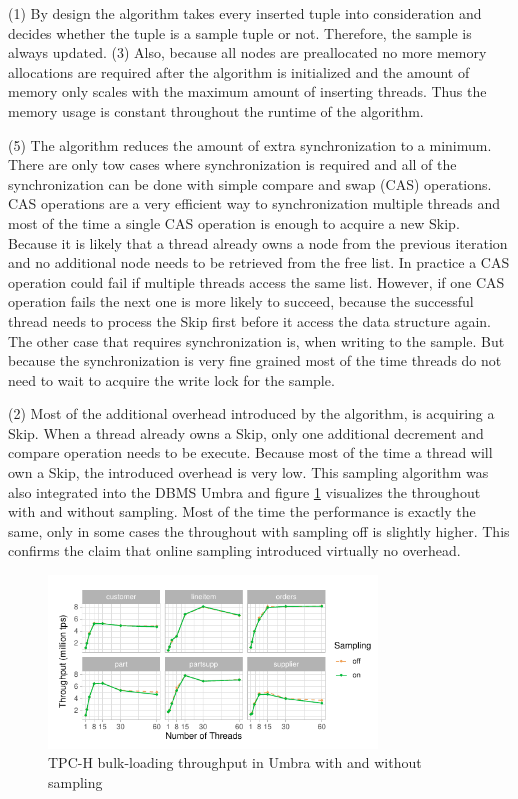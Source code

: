 \documentclass[sigconf,nonacm]{acmart}
\begin{document}
        (1) By design the algorithm takes every inserted tuple into consideration and decides whether the tuple is a sample tuple or not. Therefore, the sample is always updated. (3) Also, because all nodes are preallocated no more memory allocations are required after the algorithm is initialized and the amount of memory only scales with the maximum amount of inserting threads. Thus the memory usage is constant throughout the runtime of the algorithm. 

        (5) The algorithm reduces the amount of extra synchronization to a minimum. There are only tow cases where synchronization is required and all of the synchronization can be done with simple compare and swap (CAS) operations. CAS operations are a very efficient way to  synchronization multiple threads and most of the time a single CAS operation is enough to acquire a new Skip. Because it is likely that a thread already owns a node from the previous iteration and no additional node needs to be retrieved from the free list. In practice a CAS operation could fail if multiple threads access the same list. However, if one CAS operation fails the next one is more likely to succeed, because the successful thread needs to process the Skip first before it access the data structure again. The other case that requires synchronization is, when writing to the sample. But because the synchronization is very fine grained most of the time threads do not need to wait to acquire the write lock for the sample.

        (2) Most of the additional overhead introduced by the algorithm, is acquiring a Skip. When a thread already owns a Skip, only one additional decrement and compare operation needs to be execute. Because most of the time a thread will own a Skip, the introduced overhead is very low. This sampling algorithm was also integrated into the DBMS Umbra\cite{Umbra} and figure \ref{fig:performance} visualizes the throughout with and without sampling. Most of the time the performance is exactly the same, only in some cases the throughout with sampling off is slightly higher. This confirms the claim that online sampling introduced virtually no overhead.
        \begin{figure}[h]
            \includegraphics[height=4.6cm]{figure7.pdf}
            \caption{TPC-H bulk-loading throughput in Umbra\cite{Umbra} with
            and without sampling \cite[figure 6]{OG}}
            \label{fig:performance}
        \end{figure}
\end{document}
